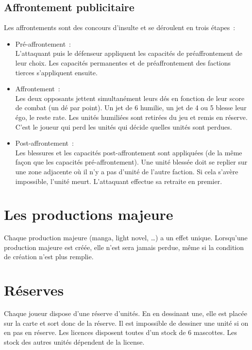             \subsection{Affrontement publicitaire}
                Les affrontements sont des concours d'insulte et se déroulent en trois étapes :
                \begin{itemize}
                    \item Pré-affrontement : \\
                        L'attaquant puis le défenseur appliquent les capacités de préaffrontement de leur choix.
                        Les capacités permanentes et de préaffrontement des factions tierces s'appliquent ensuite.
                    \item Affrontement : \\
                        Les deux opposants jettent simultanément leurs dés en fonction de leur score de combat (un dé par point).
                        Un jet de 6 humilie, un jet de 4 ou 5 blesse leur égo, le reste rate.
                        Les unités humiliées sont retirées du jeu et remis en réserve. C'est le joueur qui perd les unités qui décide quelles unités sont perdues.
                    \item Post-affrontement : \\
                        Les blessures et les capacités post-affrontement sont appliquées (de la même façon que les capacités pré-affrontement).
                        Une unité blessée doit se replier sur une zone adjacente où il n'y a pas d'unité de l'autre faction.
                        Si cela s'avère impossible, l'unité meurt.
                        L'attaquant effectue sa retraite en premier.
                \end{itemize}


        \section{Les productions majeure}

            Chaque production majeure (manga, light novel, …) a un effet unique.
            Lorsqu'une production majeure est créée, elle n'est sera jamais perdue, même si la condition de création n'est plus remplie.

        \section{Réserves}
            Chaque joueur dispose d'une réserve d'unités. En en dessinant une, elle est placée sur la carte et
            sort donc de la réserve. Il est impossible de dessiner une unité si on en pas en réserve. \newline
            Les licences disposent toutes d'un stock de 6 mascottes. Les stock des autres unités dépendent de
            la license.

